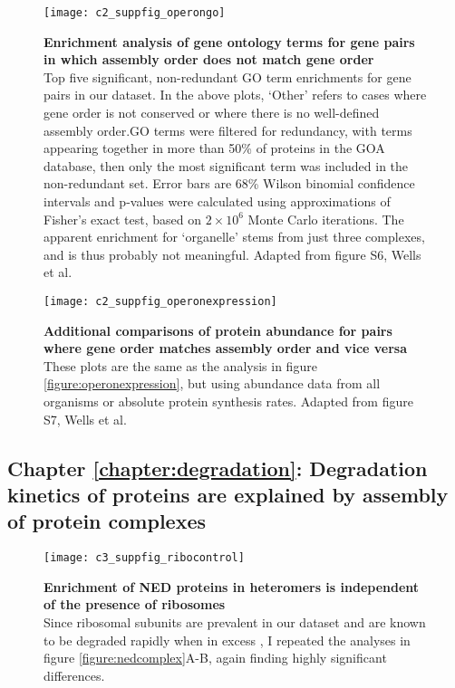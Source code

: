 \documentclass[a4paper,11pt,twoside,openright]{scrbook}
\begin{document}
\begin{figure} \texttt{[image: c2\_suppfig\_operongo]} \caption[Enrichment
    analysis of gene ontology terms for gene pairs in which assembly order does
    not match gene order]{\sffamily \textbf{Enrichment analysis of gene ontology
    terms for gene pairs in which assembly order does not match gene order} \\
    \small Top five significant, non-redundant GO term enrichments for gene
    pairs in our dataset. In the above plots, `Other' refers to cases where gene
    order is not conserved or where there is no well-defined assembly order.GO
    terms were filtered for redundancy, with terms appearing together in more
    than 50\% of proteins in the GOA database, then only the most significant
    term was included in the non-redundant set. Error bars are 68\% Wilson
    binomial confidence intervals and p-values were calculated using
    approximations of Fisher's exact test, based on \(2 \times 10^{6}\) Monte
    Carlo iterations. The apparent enrichment for `organelle' stems from just
    three complexes, and is thus probably not meaningful. Adapted from figure
    S6, Wells et al. \cite{Wells2016}} \label{suppfigure:operongo} \end{figure}

\begin{figure} \texttt{[image: c2\_suppfig\_operonexpression]} \caption[Additional
    comparisons of protein abundance for pairs where gene order matches assembly
    order and vice versa]{\sffamily \textbf{Additional comparisons of protein
    abundance for pairs where gene order matches assembly order and vice versa}
    \\ \small These plots are the same as the analysis in figure
    \ref{figure:operonexpression}, but using abundance data from all organisms
    or absolute protein synthesis rates. Adapted from figure S7, Wells et al.
    \cite{Wells2016}} \label{suppfigure:operonexpression} \end{figure}

\clearpage

\subsection{Chapter \ref*{chapter:degradation}: Degradation kinetics of proteins
are explained by assembly of protein complexes}

\begin{figure}[h] \texttt{[image: c3\_suppfig\_ribocontrol]} \caption[Enrichment
    of NED proteins in heteromers is independent of the presence of
    ribosomes]{\sffamily \textbf{Enrichment of NED proteins in heteromers is
    independent of the presence of ribosomes} \\ \small Since ribosomal subunits
    are prevalent in our dataset and are known to be degraded rapidly when in
    excess \cite{Warner1999,Sung2016}, I repeated the analyses in figure
    \ref{figure:nedcomplex}A-B, again finding highly significant differences.}
\label{suppfigure:ribocontrol} \end{figure}
\end{document}
